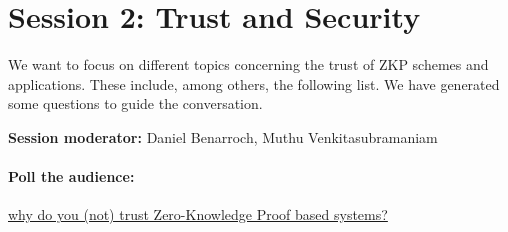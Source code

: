 \section{Session 2: Trust and Security}
\label{sec:zcon0:session2-trust-and-security}

We want to focus on different topics concerning the trust of ZKP schemes and applications.
These include, among others, the following list. We have generated some questions to guide the conversation.
\loosen

\textbf{Session moderator:} Daniel Benarroch, Muthu Venkitasubramaniam


\paragraph{Poll the audience:} \underline{why do you (not) trust Zero-Knowledge Proof based systems?}

